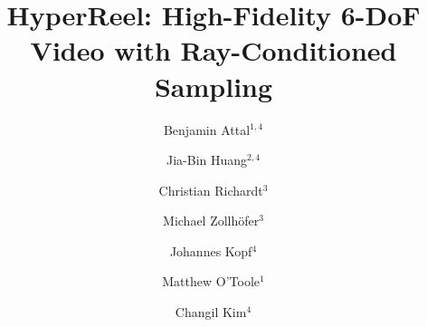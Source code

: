 \documentclass[10pt,twocolumn,letterpaper]{article}
\begin{document}
\newcommand{\mo}[1]{\textcolor{red}{[\texttt{Matt}: #1]}}
\newcommand{\MZ}[1]{\textcolor{red}{[\texttt{MZ}: #1]}}

\newcommand{\isdraft}{false}


\newcommand{\flux}{\Phi}
\newcommand{\normal}{\mathbf{n}}
\newcommand{\position}{\mathbf{x}}
\newcommand{\xpos}{\mathbf{x}}
\newcommand{\ypos}{\mathbf{y}}
\newcommand{\direction}{\boldsymbol{\omega}}
\newcommand{\dirin}{\direction_\text{i}}
\newcommand{\dirout}{\vec{\direction}}
\newcommand{\hemisphere}{\altmathcal{H}^2}
\newcommand{\withnorm}{[\normal]}
\newcommand{\withgeom}{[\normal_g]}
\newcommand{\withshading}{[\normal_s]}
\newcommand{\withboth}{[\normal_g, \normal_s]}
\newcommand{\inout}{\dirin \rightarrow \dirout}
\newcommand{\outin}{\dirout \rightarrow \dirin}
\newcommand{\emitted}{L_\text{e}}
\newcommand{\importance}{W_\text{e}}
\newcommand{\freeflight}{p_\text{ff}}
\newcommand{\im}{\mathrm{i}}
\newcommand{\tnear}{{t_\text{n}}}
\newcommand{\tfar}{{t_\text{f}}}
\newcommand{\network}{F_{\boldsymbol\theta}}
\newcommand{\rgbL}{L_{\text{RGB}}}
\newcommand{\irL}{L_{\text{IR}}}
\newcommand{\tofL}{L_{\text{ToF}}}
\newcommand{\rgbhatL}{\hat{L}_{\text{RGB}}}
\newcommand{\irhatL}{\hat{L}_{\text{IR}}}
\newcommand{\tofhatL}{\hat{L}_{\text{ToF}}}
\newcommand{\Iref}{I_{\text{s}}}
\newcommand{\timet}{\tau}
\newcommand{\latent}{\mathbf{z}}
\newcommand{\static}{\text{stat}}
\newcommand{\dynamic}{\text{dyn}}

\newcommand{\firstplane}{\pi^{xy}}
\newcommand{\secondplane}{\pi^{uv}}
\newcommand{\posenc}{\boldsymbol\gamma}
\newcommand{\ray}{\mathbf{r}}
\newcommand{\rayparam}{x, y, u, v}
\newcommand{\voxset}{\altmathcal{V}}
\newcommand{\vox}{\upsilon}
\newcommand{\col}{\mathbf{c}}

\newcommand{\mpage}[2]
{
\begin{minipage}{#1\linewidth}\centering
#2
\end{minipage}
} 
\title{
HyperReel: High-Fidelity 6-DoF Video with Ray-Conditioned Sampling
}








\author{\parbox{.2\linewidth}{\centering Benjamin Attal$^{1,4}$
}
\hspace{-3mm}\and\hspace{-3mm}
\parbox{.2\linewidth}{\centering Jia-Bin Huang$^{2,4}$}
\hspace{-3mm}\and\hspace{-3mm}
\parbox{.2\linewidth}{\centering Christian Richardt$^{3}$}
\hspace{-3mm}\and\hspace{-3mm}
\parbox{.2\linewidth}{\centering Michael Zollh\"ofer$^{3}$}
\hspace{-3mm}\and\hspace{-3mm}
\parbox{.2\linewidth}{\centering Johannes Kopf$^{4}$}
\hspace{-3mm}\and\hspace{-3mm}
\parbox{.2\linewidth}{\centering Matthew O'Toole$^{1}$}
\hspace{-3mm}\and\hspace{-3mm}
\parbox{.2\linewidth}{\centering Changil Kim$^{4}$}
}
\end{document}
